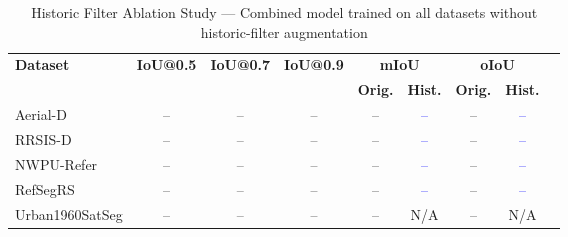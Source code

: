 \begin{table}[t]
\centering
\caption{Historic Filter Ablation Study — Combined model trained on all datasets without historic-filter augmentation}
\label{tab:historic_ablation_results}
\begin{tabular}{@{}lcccccccc@{}}
\toprule
\textbf{Dataset} & \textbf{IoU@0.5} & \textbf{IoU@0.7} & \textbf{IoU@0.9} & \multicolumn{2}{c}{\textbf{mIoU}} & \multicolumn{2}{c}{\textbf{oIoU}} \\
\cmidrule(lr){5-6} \cmidrule(lr){7-8}
 & & & & \textbf{Orig.} & \textbf{Hist.} & \textbf{Orig.} & \textbf{Hist.} \\
\midrule
Aerial-D & -- & -- & -- & -- & \textcolor{blue}{--} & -- & \textcolor{blue}{--} \\
RRSIS-D & -- & -- & -- & -- & \textcolor{blue}{--} & -- & \textcolor{blue}{--} \\
NWPU-Refer & -- & -- & -- & -- & \textcolor{blue}{--} & -- & \textcolor{blue}{--} \\
RefSegRS & -- & -- & -- & -- & \textcolor{blue}{--} & -- & \textcolor{blue}{--} \\
Urban1960SatSeg & -- & -- & -- & -- & N/A & -- & N/A \\
\bottomrule
\end{tabular}
\end{table}
